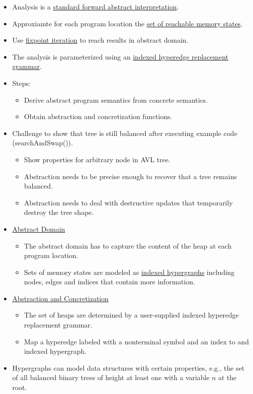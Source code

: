 \documentclass[a4paper,12pt]{article}
\begin{document}
\begin{itemize}
	\item Analysis is a \ul{standard forward abstract interpretation}.
	\item Approxiamte for each program location the \ul{set of reachable memory states}.
	\item Use \ul{fixpoint iteration} to reach results in abstract domain.
	\item The analysis is parameterized using an \ul{indexed hyperedge replacement grammar}.
	\item Steps:
	\begin{itemize}
		\item Derive abstract program semantics from concrete semantics.
		\item Obtain abstraction and concretization functions.
	\end{itemize}
	\item Challenge to show that tree is still balanced after executing example code (searchAndSwap()).
	\begin{itemize}
		\item Show properties for arbitrary node in AVL tree.
		\item Abstraction needs to be precise enough to recover that a tree remains balanced.
		\item Abstraction needs to deal with destructive updates that temporarily destroy the tree shape.
	\end{itemize}
	\item \ul{Abstract Domain}
	\begin{itemize}
		\item The abstract domain has to capture the content of the heap at each program location.
		\item Sets of memory states are modeled as \ul{indexed hypergraphs} including nodes, edges and indices that contain more information.
	\end{itemize}
	\item \ul{Abstraction and Concretization}
	\begin{itemize}
		\item The set of heaps are determined by a user-supplied indexed hyperedge replacement grammar.
		\item Map a hyperedge labeled with a nonterminal symbol and an index to and indexed hypergraph.
	\end{itemize}
	\item Hypergraphs can model data structures with certain properties, e.g., the set of all balanced binary trees of height at least one with a variable $n$ at the root. 

\end{itemize}
\end{document}
